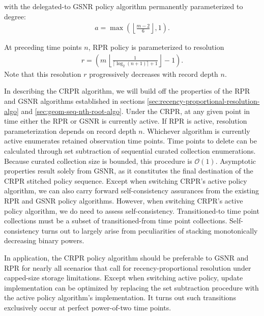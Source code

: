 with the delegated-to GSNR policy algorithm permanently parameterized to degree:
\begin{align*}
a = \max \left(
  \left\lfloor \frac{m - 2}{6} \right\rfloor,
  1
\right).
\end{align*}

At preceding time points $n$, RPR policy is parameterized to resolution
\begin{align*}
r = \left(
  m \,
  \left\lfloor
  \frac{1}{\lceil \log_2(n + 1) \rceil + 1}
  \right\rfloor
  - 1
\right).
\end{align*}
Note that this resolution $r$ progressively decreases with record depth $n$.

In describing the CRPR algorithm, we will build off the properties of the RPR and GSNR algorithms established in sections \ref{sec:recency-proportional-resolution-algo} and \ref{sec:geom-seq-nth-root-algo}.
Under the CRPR, at any given point in time either the RPR or GSNR is currently active.
If RPR is active, resolution parameterization depends on record depth $n$.
Whichever algorithm is currently active enumerates retained observation time points.
Time points to delete can be calculated through set subtraction of sequential curated collection enumerations.
Because curated collection size is bounded, this procedure is $\mathcal{O}(1)$.
Asymptotic properties result solely from GSNR, as it constitutes the final destination of the CRPR stitched policy sequence.
Except when switching CRPR's active policy algorithm, we can also carry forward self-consistency assurances from the existing RPR and GSNR policy algorithms.
However, when switching CRPR's active policy algorithm, we do need to assess self-consistency.
Transitioned-to time point collections must be a subset of transitioned-from time point collections.
Self-consistency turns out to largely arise from peculiarities of stacking monotonically decreasing binary powers.


In application, the CRPR policy algorithm should be preferable to GSNR and RPR for nearly all scenarios that call for recency-proportional resolution under capped-size storage limitations.
Except when switching active policy, update implementation can be optimized by replacing the set subtraction procedure with the active policy algorithm's implementation.
It turns out such transitions exclusively occur at perfect power-of-two time points.

% 
